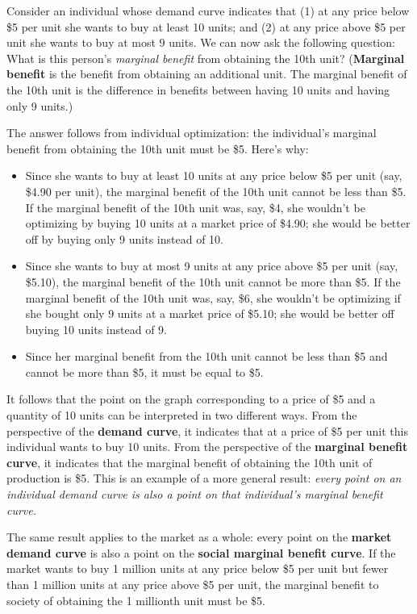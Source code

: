 Consider an individual whose demand curve indicates that (1) at any price below \$5 per unit she wants to buy at least 10 units; and (2) at any price above \$5 per unit she wants to buy at most 9 units. We can now ask the following question: What is this person's \emph{marginal benefit} from obtaining the 10th unit? (\textbf{Marginal benefit} is the benefit from obtaining an additional unit. The marginal benefit of the 10th unit is the difference in benefits between having 10 units and having only 9 units.)

The answer follows from individual optimization: the individual's marginal benefit from obtaining the 10th unit must be \$5. Here's why:
\begin{itemize}
\item Since she wants to buy at least 10 units at any price below \$5 per unit (say, \$4.90 per unit), the marginal benefit of the 10th unit cannot be less than \$5. If the marginal benefit of the 10th unit was, say, \$4, she wouldn't be optimizing by buying 10 units at a market price of \$4.90; she would be better off by buying only 9 units instead of 10. 
\item Since she wants to buy at most 9 units at any price above \$5 per unit (say, \$5.10), the marginal benefit of the 10th unit cannot be more than \$5. If the marginal benefit of the 10th unit was, say, \$6, she wouldn't be optimizing if she bought only 9 units at a market price of \$5.10; she would be better off buying 10 units instead of 9. 
\item Since her marginal benefit from the 10th unit cannot be less than \$5 and cannot be more than \$5, it must be equal to \$5.
\end{itemize}
It follows that the point on the graph corresponding to a price of \$5 and a quantity of 10 units can be interpreted in two different ways. From the perspective of the \textbf{demand curve}, it indicates that at a price of \$5 per unit this individual wants to buy 10 units. From the perspective of the \textbf{marginal benefit curve}, it indicates that the marginal benefit of obtaining the 10th unit of production is \$5. This is an example of a more general result: \emph{every point on an individual demand curve is also a point on that individual's marginal benefit curve.}

The same result applies to the market as a whole: every point on the \textbf{market demand curve} is also a point on the \textbf{social marginal benefit curve}. If the market wants to buy 1 million units at any price below \$5 per unit but fewer than 1 million units at any price above \$5 per unit, the marginal benefit to society of obtaining the 1 millionth unit must be \$5.


